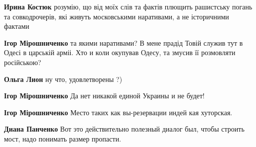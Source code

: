 \begin{itemize}
\begin{itemize}
 

\textbf{Ирина Костюк} розумію, що від моїх слів та фактів плющить рашистську
погань та совкодрочерів, які живуть московськими наративами, а не історичними
фактами

 
\textbf{Ігор Мірошниченко} та якими наративами? В мене прадід Товій служив тут
в Одесі в царській арміі. Хто и коли окупував Одесу, та змусив її розмовляти
російською?


 
\textbf{Ольга Лион} ну что, удовлетворены ?)

 
\textbf{Ігор Мірошниченко} Да нет никакой единой Украины и не будет!

 
\textbf{Ігор Мірошниченко} Место таких как вы-резервации индей кая хуторская.

 
\textbf{Диана Панченко} Вот это действительно полезный диалог был, чтобы строить мост, надо понимать размер пропасти.


\end{itemize}
\end{itemize}

